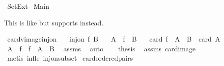 %
\begin{isabellebody}%
%
%
\isadelimtheory
%
\endisadelimtheory
%
\isatagtheory
{}\isamarkupfalse%
\ Set{\isacharunderscore}{\kern0pt}Ext\isanewline
{}\ Main\isanewline
{}%
\endisatagtheory
{\isafoldtheory}%
%
\isadelimtheory
%
\endisadelimtheory
%
\begin{isamarkuptext}%
This is like  but supports  instead.%
\end{isamarkuptext}\isamarkuptrue%
\isamarkupfalse%
\ card{\isacharunderscore}{\kern0pt}vimage{\isacharunderscore}{\kern0pt}inj{\isacharunderscore}{\kern0pt}on{\isacharcolon}{\kern0pt}\isanewline
\ \ \ {\isachardoublequoteopen}inj{\isacharunderscore}{\kern0pt}on\ f\ B{\isachardoublequoteclose}\isanewline
\ \ \ {\isachardoublequoteopen}A\ {\isasymsubseteq}\ f\ {\isacharbackquote}{\kern0pt}\ B{\isachardoublequoteclose}\isanewline
\ \ \ {\isachardoublequoteopen}card\ {\isacharparenleft}{\kern0pt}f\ {\isacharminus}{\kern0pt}{\isacharbackquote}{\kern0pt}\ A\ {\isasyminter}\ B{\isacharparenright}{\kern0pt}\ {\isacharequal}{\kern0pt}\ card\ A{\isachardoublequoteclose}\isanewline
%
\isadelimproof
%
\endisadelimproof
%
\isatagproof
{}\isamarkupfalse%
\ {\isacharminus}{\kern0pt}\isanewline
\ \ \isamarkupfalse%
\ {\isachardoublequoteopen}A\ {\isacharequal}{\kern0pt}\ f\ {\isacharbackquote}{\kern0pt}\ {\isacharparenleft}{\kern0pt}f\ {\isacharminus}{\kern0pt}{\isacharbackquote}{\kern0pt}\ A\ {\isasyminter}\ B{\isacharparenright}{\kern0pt}{\isachardoublequoteclose}\ \isamarkupfalse%
\ assms{\isacharparenleft}{\kern0pt}{}{\isacharparenright}{\kern0pt}\ \isamarkupfalse%
\ auto\isanewline
\ \ \isamarkupfalse%
\ {\isacharquery}{\kern0pt}thesis\ \isamarkupfalse%
\ assms\ card{\isacharunderscore}{\kern0pt}image\ \isanewline
\ \ \ \ \isamarkupfalse%
\ {\isacharparenleft}{\kern0pt}metis\ inf{\isacharunderscore}{\kern0pt}le{}\ inj{\isacharunderscore}{\kern0pt}on{\isacharunderscore}{\kern0pt}subset{\isacharparenright}{\kern0pt}\isanewline
{}\isamarkupfalse%
%
\endisatagproof
{\isafoldproof}%
%
\isadelimproof
\isanewline
%
\endisadelimproof
\isanewline
{}\isamarkupfalse%
\ card{\isacharunderscore}{\kern0pt}ordered{\isacharunderscore}{\kern0pt}pairs{\isacharcolon}{\kern0pt}\isanewline

\end{isabellebody}
